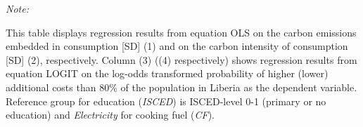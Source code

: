 \begin{table}[htbp!]
\begin{adjustbox}{width = 1\textwidth, max height = 0.95\textheight, center}
\begin{threeparttable}[b]
         \begin{tablenotes}\item \medskip \textit{Note:}
            \item This table displays regression results from equation OLS on the carbon emissions embedded in consumption [SD] (1) and on the carbon intensity of consumption [SD] (2), respectively. 
                                      Column (3) ((4) respectively) shows regression results from equation LOGIT on the log-odds transformed probability of higher (lower) additional costs than 80\% of the population in Liberia as the dependent variable. Reference group for education (\textit{ISCED}) is ISCED-level 0-1 (primary or no education) and \textit{Electricity} for cooking fuel (\textit{CF}).
         \end{tablenotes}
      \end{threeparttable}
   \end{adjustbox}
\end{table}


